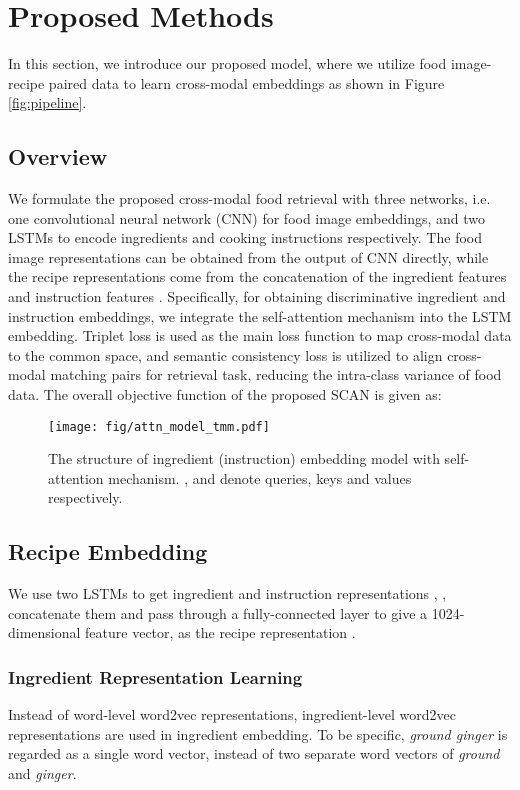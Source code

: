 \documentclass[journal]{IEEEtran}
\begin{document}
\section{Proposed Methods}
In this section, we introduce our proposed model, where we utilize food image-recipe paired data to learn cross-modal embeddings as shown in Figure \ref{fig:pipeline}.

\subsection{Overview}
We formulate the proposed cross-modal food retrieval with three networks, i.e. one convolutional neural network (CNN) for food image embeddings, and two LSTMs to encode ingredients and cooking instructions respectively. The food image representations  can be obtained from the output of CNN directly, while the recipe representations  come from the concatenation of the ingredient features  and instruction features . 
Specifically, for obtaining discriminative ingredient and instruction embeddings, we integrate the self-attention mechanism \cite{vaswani2017attention} into the LSTM embedding. 
Triplet loss is used as the main loss function  to map cross-modal data to the common space, and semantic consistency loss  is utilized to align cross-modal matching pairs for retrieval task, reducing the intra-class variance of food data. The overall objective function of the proposed SCAN is given as:


\begin{figure}
\begin{center}
\texttt{[image: fig/attn\_model\_tmm.pdf]}
\end{center}
   \caption{The structure of ingredient (instruction) embedding model with self-attention mechanism. ,  and  denote queries, keys and values respectively.}
\label{fig:attn_model}
\end{figure}

\subsection{Recipe Embedding}
We use two LSTMs to get ingredient and instruction representations , , concatenate them and pass through a fully-connected layer to give a 1024-dimensional feature vector, as the recipe representation .

\subsubsection{Ingredient Representation Learning}
Instead of word-level word2vec representations, ingredient-level word2vec representations are used in ingredient embedding. To be specific, \emph{ground ginger} is regarded as a single word vector, instead of two separate word vectors of \emph{ground} and \emph{ginger}. 
\end{document}

